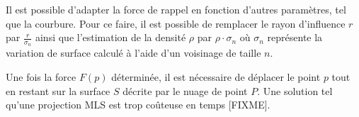 Il est possible d'adapter la force de rappel en fonction d'autres paramètres, tel que la courbure. Pour ce faire, il est possible de remplacer le rayon d'influence $r$ par $\frac{r}{\sigma_n}$ ainsi que l'estimation de la densité $\rho$ par $\rho\cdot\sigma_n$ où $\sigma_n$ représente la variation de surface calculé à l'aide d'un voisinage de taille $n$.

Une fois la force $F(p)$ déterminée, il est nécessaire de déplacer le point $p$ tout en restant sur la surface $S$ décrite par le nuage de point $P$. Une solution tel qu'une projection MLS est trop coûteuse en temps [FIXME].